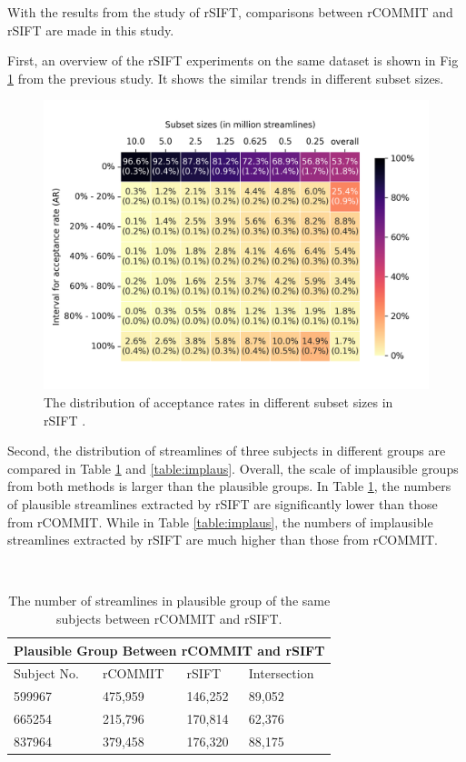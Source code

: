 With the results from the study of rSIFT, comparisons between rCOMMIT and rSIFT are made in this study. 

First, an overview of the rSIFT \cite{hainAssessingStreamlinePlausibility2022} experiments on the same dataset 
is shown in Fig \ref{fig:heatmap_sift} from the previous study. It shows the similar trends in different subset sizes. 


\begin{figure}[ht]
    \centering
    \includegraphics[width= 12cm]{figures/table_rsift.png}
        \caption{The distribution of acceptance rates in different subset sizes in rSIFT \cite{hainAssessingStreamlinePlausibility2022}.
        }
    \label{fig:heatmap_sift}
\end{figure}


Second, the distribution of streamlines of three subjects in different groups are compared in Table \ref*{table:plaus} and \ref*{table:implaus}.
Overall, the scale of implausible groups from both methods is larger than the plausible groups.
In Table \ref*{table:plaus}, the numbers of plausible streamlines extracted by rSIFT are significantly lower than those from rCOMMIT.
While in Table \ref*{table:implaus}, the numbers of implausible streamlines extracted by rSIFT are much higher than those from rCOMMIT.
\begin{table}[!ht]
    \centering
    \caption{The number of streamlines in plausible group of the same subjects between rCOMMIT and rSIFT.}
    ~\\
    \label{table:plaus}
    \begin{tabular}{p{3cm}|p{3cm}|p{3cm}|p{3cm}}
    \toprule
    \multicolumn{4}{c}{\textbf{Plausible Group Between rCOMMIT and rSIFT}} \\
    \toprule
    Subject No. & rCOMMIT & rSIFT & Intersection \\
    \hline
    599967 & 475,959 &146,252 & 89,052 \\
    \hline
    665254 & 215,796 &170,814 & 62,376 \\
    \hline
    837964 & 379,458 &176,320 & 88,175 \\
    \bottomrule
    \end{tabular}
\end{table}

